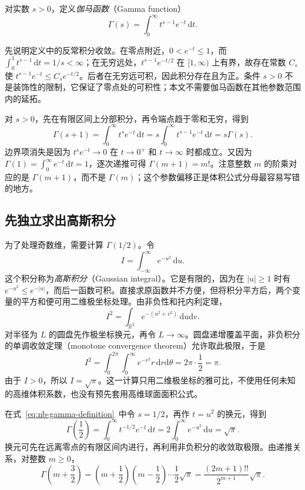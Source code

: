 \documentclass[UTF8,12pt,a4paper,fontset=fandol]{ctexart}
\begin{document}
\begin{definition}[伽马函数]
对实数 $s>0$，定义\emph{伽马函数}（Gamma function）
\begin{equation}\label{eq:nb-gamma-definition}
  \Gamma(s)=\int_0^\infty t^{s-1}e^{-t}\,\mathrm dt.
\end{equation}
\end{definition}

先说明定义中的反常积分收敛。在零点附近，$0<e^{-t}\leq1$，而 $\int_0^1t^{s-1}\,\mathrm dt=1/s<\infty$；在无穷远处，$t^{s-1}e^{-t/2}$ 在 $[1,\infty)$ 上有界，故存在常数 $C_s$ 使 $t^{s-1}e^{-t}\leq C_se^{-t/2}$。后者在无穷远可积，因此积分存在且为正。条件 $s>0$ 不是装饰性的限制，它保证了零点处的可积性；本文不需要伽马函数在其他参数范围内的延拓。

对 $s>0$，先在有限区间上分部积分，再令端点趋于零和无穷，得到
\begin{equation}\label{eq:nb-gamma-recurrence}
  \Gamma(s+1)=\int_0^\infty t^se^{-t}\,\mathrm dt
  =s\int_0^\infty t^{s-1}e^{-t}\,\mathrm dt=s\Gamma(s).
\end{equation}
边界项消失是因为 $t^se^{-t}\to0$ 在 $t\to0^+$ 和 $t\to\infty$ 时都成立。又因为 $\Gamma(1)=\int_0^\infty e^{-t}\,\mathrm dt=1$，逐次递推可得 $\Gamma(m+1)=m!$。注意整数 $m$ 的阶乘对应的是 $\Gamma(m+1)$，而不是 $\Gamma(m)$；这个参数偏移正是体积公式分母最容易写错的地方。

\subsection{先独立求出高斯积分}
\label{subsec:nb-gaussian-one}

为了处理奇数维，需要计算 $\Gamma(1/2)$。令
\[
  I=\int_{-\infty}^{\infty}e^{-u^2}\,\mathrm du.
\]
这个积分称为\emph{高斯积分}（Gaussian integral）。它是有限的，因为在 $|u|\geq1$ 时有 $e^{-u^2}\leq e^{-|u|}$，而后一函数可积。直接求原函数并不方便，但将积分平方后，两个变量的平方和便可用二维极坐标处理。由非负性和托内利定理，
\[
  I^2=\int_{\mathbb R^2}e^{-(u^2+v^2)}\,\mathrm du\mathrm dv.
\]
对半径为 $L$ 的圆盘先作极坐标换元，再令 $L\to\infty$。圆盘递增覆盖平面，非负积分的单调收敛定理（monotone convergence theorem）允许取此极限，于是
\[
  I^2=\int_0^{2\pi}\int_0^\infty e^{-r^2}r\,\mathrm dr\mathrm d\theta
  =2\pi\cdot\frac12=\pi.
\]
由于 $I>0$，所以 $I=\sqrt\pi$。这一计算只用二维极坐标的雅可比，不使用任何未知的高维体积系数，也没有预先套用高维球面面积公式。

在式~\eqref{eq:nb-gamma-definition}~中令 $s=1/2$，再作 $t=u^2$ 的换元，得到
\[
  \Gamma\!\left(\frac12\right)
  =\int_0^\infty t^{-1/2}e^{-t}\,\mathrm dt
  =2\int_0^\infty e^{-u^2}\,\mathrm du=\sqrt\pi.
\]
换元可先在远离零点的有限区间内进行，再利用非负积分的收敛取极限。由递推关系，对整数 $m\geq0$，
\begin{equation}\label{eq:nb-half-gamma}
  \Gamma\!\left(m+\frac32\right)
  =\left(m+\frac12\right)\left(m-\frac12\right)\cdots\frac12\sqrt\pi
  =\frac{(2m+1)!!}{2^{m+1}}\sqrt\pi.
\end{equation}
\end{document}
